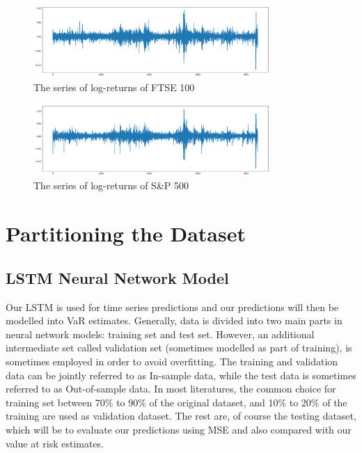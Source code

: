 \documentclass[a4paper,11pt,oneside]{book}
\begin{document}
\begin{figure}[!h]
	\centering
	\includegraphics[width=0.8\textwidth]{figures/logFTSE}
	\caption{The series of log-returns of FTSE 100}
	\label{logFTSE}
\end{figure}


\begin{figure}[!h]
	\centering
	\includegraphics[width=0.8\textwidth]{figures/logS&P500}
	\caption{The series of log-returns of S\&P 500}
	\label{logSandP 500}
\end{figure}

\section{Partitioning the Dataset}
\subsection{LSTM Neural Network Model}

Our LSTM is used for time series predictions and our predictions will then be modelled into VaR estimates. Generally, data is divided into two main parts in neural network models: training set and test set. However, an additional intermediate set called validation set (sometimes modelled as part of training), is sometimes employed in order to avoid overfitting. The training and validation data can be jointly referred to as In-sample data, while the test data is sometimes referred to as Out-of-sample data. In most literatures, the common choice for training set between 70\% to 90\% of the original dataset, and 10\% to 20\% of the training are used as validation dataset. The rest are, of course the testing dataset, which will be to evaluate our predictions using MSE and also compared with our value at risk estimates. \newline\newline
\end{document}
